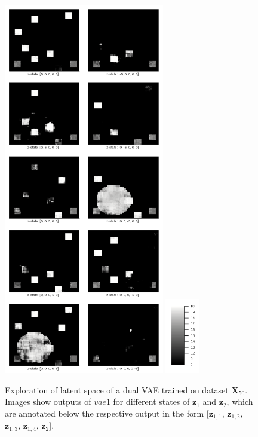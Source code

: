\documentclass[12pt]{report}
\theoremstyle{definition}
\begin{document}
\begin{figure}
\begin{center}
  \includegraphics[width=7cm]{../code/plots/exploration2.png}
  \includegraphics[width=1.5cm]{../code/plots/scale.png}
  \caption{Exploration of latent space of a dual VAE trained on dataset $\mathbf{X}_{50}$. Images show outputs of $vae1$ for different states of $\mathbf{z}_1$ and $\mathbf{z}_2$, which are annotated below the respective output in the form [$\mathbf{z}_{1, 1}$, $\mathbf{z}_{1, 2}$, $\mathbf{z}_{1, 3}$, $\mathbf{z}_{1, 4}$, $\mathbf{z}_2$].}
  \label{fig:expl2}
\end{center}
\end{figure}
\end{document}
